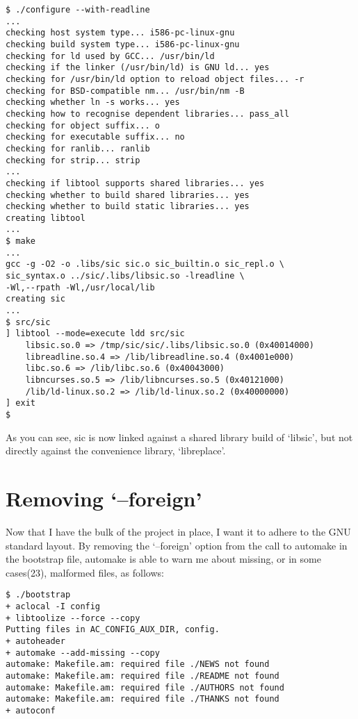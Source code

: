 \begin{Verbatim}[frame=single]
$ ./configure --with-readline
...
checking host system type... i586-pc-linux-gnu
checking build system type... i586-pc-linux-gnu
checking for ld used by GCC... /usr/bin/ld
checking if the linker (/usr/bin/ld) is GNU ld... yes
checking for /usr/bin/ld option to reload object files... -r
checking for BSD-compatible nm... /usr/bin/nm -B
checking whether ln -s works... yes
checking how to recognise dependent libraries... pass_all
checking for object suffix... o
checking for executable suffix... no
checking for ranlib... ranlib
checking for strip... strip
...
checking if libtool supports shared libraries... yes
checking whether to build shared libraries... yes
checking whether to build static libraries... yes
creating libtool
...
$ make
...
gcc -g -O2 -o .libs/sic sic.o sic_builtin.o sic_repl.o \
sic_syntax.o ../sic/.libs/libsic.so -lreadline \
-Wl,--rpath -Wl,/usr/local/lib
creating sic
...
$ src/sic
] libtool --mode=execute ldd src/sic
    libsic.so.0 => /tmp/sic/sic/.libs/libsic.so.0 (0x40014000)
    libreadline.so.4 => /lib/libreadline.so.4 (0x4001e000)
    libc.so.6 => /lib/libc.so.6 (0x40043000)
    libncurses.so.5 => /lib/libncurses.so.5 (0x40121000)
    /lib/ld-linux.so.2 => /lib/ld-linux.so.2 (0x40000000)
] exit
$
\end{Verbatim}

As you can see, sic is now linked against a shared library build of `libsic', but not directly against the convenience library, `libreplace'.

\section{Removing `--foreign'}


Now that I have the bulk of the project in place, I want it to adhere to the GNU standard layout. By removing the `--foreign' option from the call to automake in the bootstrap file, automake is able to warn me about missing, or in some cases(23), malformed files, as follows:

\begin{Verbatim}[frame=single]
$ ./bootstrap
+ aclocal -I config
+ libtoolize --force --copy
Putting files in AC_CONFIG_AUX_DIR, config.
+ autoheader
+ automake --add-missing --copy
automake: Makefile.am: required file ./NEWS not found
automake: Makefile.am: required file ./README not found
automake: Makefile.am: required file ./AUTHORS not found
automake: Makefile.am: required file ./THANKS not found
+ autoconf
\end{Verbatim}

